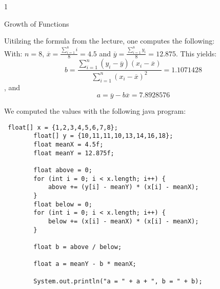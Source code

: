 \documentclass{article}
\begin{document}
    \begin{ukon-infie}[30/October/2017]{1}
    
\begin{exercise}[p=8]{Growth of Functions}	

 Uitilzing the formula from the lecture, one computes the following: \\
 
 With: $n = 8$, $\overline{x} = \frac{\sum_{i = 1}^8 i}{8} = 4.5$ and $\overline{y} = \frac{\sum_{i = 1}^8 y_i}{8} = 12.875$. This yields: \\
 $$ b = \frac{\sum_{i = 1}^n(y_i - \overline{y})(x_i - \overline{x})}{\sum_{i = 1}^n(x_i - \overline{x})^2} = 1.1071428$$, and
 $$ a = \overline{y} - b \overline{x} = 7.8928576$$
 
 We computed the values with the following java program: \\
 \begin{verbatim}
 float[] x = {1,2,3,4,5,6,7,8};
        float[] y = {10,11,11,10,13,14,16,18};
        float meanX = 4.5f;
        float meanY = 12.875f;

        float above = 0;
        for (int i = 0; i < x.length; i++) {
            above += (y[i] - meanY) * (x[i] - meanX);
        }
        float below = 0;
        for (int i = 0; i < x.length; i++) {
            below += (x[i] - meanX) * (x[i] - meanX);
        }

        float b = above / below;

        float a = meanY - b * meanX;

        System.out.println("a = " + a + ", b = " + b);
 \end{verbatim}
\end{exercise}


    \end{ukon-infie}
\end{document}

